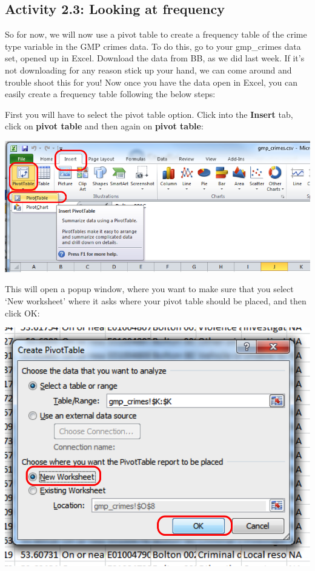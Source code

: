\documentclass[
]{book}
\begin{document}
\hypertarget{activity-2.3-looking-at-frequency}{%
\subsection{Activity 2.3: Looking at frequency}\label{activity-2.3-looking-at-frequency}}

So for now, we will now use a pivot table to create a frequency table of the crime type variable in the GMP crimes data. To do this, go to your gmp\_crimes data set, opened up in Excel. Download the data from BB, as we did last week. If it's not downloading for any reason stick up your hand, we can come around and trouble shoot this for you! Now once you have the data open in Excel, you can easily create a frequency table following the below steps:

First you will have to select the pivot table option. Click into the \textbf{Insert} tab, click on \textbf{pivot table} and then again on \textbf{pivot table}:

\includegraphics{imgs/click_pivot.png}

This will open a popup window, where you want to make sure that you select `New worksheet' where it asks where your pivot table should be placed, and then click OK:

\includegraphics{imgs/pivot_popup.png}
\end{document}

